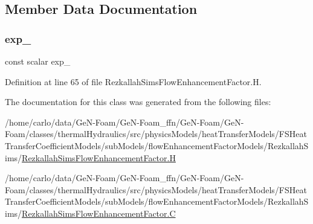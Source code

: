 \subsection{Member Data Documentation}
\mbox{\label{classFoam_1_1flowEnhancementFactorModels_1_1RezkallahSims_a9511a74dfc69afe183a7029800803961}} 
\subsubsection{\texorpdfstring{exp\+\_\+}{exp\_}}
{\footnotesize\ttfamily const scalar exp\+\_\+\hspace{0.3cm}{\ttfamily [protected]}}



Definition at line 65 of file Rezkallah\+Sims\+Flow\+Enhancement\+Factor.\+H.



The documentation for this class was generated from the following files\+:\begin{DoxyCompactItemize}
\item 
/home/carlo/data/\+Ge\+N-\/\+Foam/\+Ge\+N-\/\+Foam\+\_\+ffn/\+Ge\+N-\/\+Foam/\+Ge\+N-\/\+Foam/classes/thermal\+Hydraulics/src/physics\+Models/heat\+Transfer\+Models/\+F\+S\+Heat\+Transfer\+Coefficient\+Models/sub\+Models/flow\+Enhancement\+Factor\+Models/\+Rezkallah\+Sims/\hyperlink{RezkallahSimsFlowEnhancementFactor_8H}{Rezkallah\+Sims\+Flow\+Enhancement\+Factor.\+H}\item 
/home/carlo/data/\+Ge\+N-\/\+Foam/\+Ge\+N-\/\+Foam\+\_\+ffn/\+Ge\+N-\/\+Foam/\+Ge\+N-\/\+Foam/classes/thermal\+Hydraulics/src/physics\+Models/heat\+Transfer\+Models/\+F\+S\+Heat\+Transfer\+Coefficient\+Models/sub\+Models/flow\+Enhancement\+Factor\+Models/\+Rezkallah\+Sims/\hyperlink{RezkallahSimsFlowEnhancementFactor_8C}{Rezkallah\+Sims\+Flow\+Enhancement\+Factor.\+C}\end{DoxyCompactItemize}

